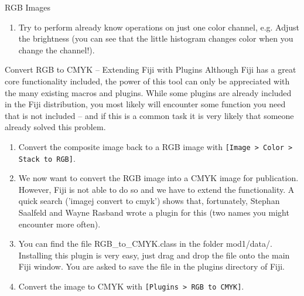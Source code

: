 \begin{taskbox}{RGB Images}
\begin{enumerate}
		\begin{minipage}[t]{\linewidth}
		\begin{center}
		\medskip
		\label{fig:channels-tool-dialog}
		\end{center}
	\end{minipage}
	
	\item Try to perform already know operations on just one color channel, e.g. Adjust the brightness (you can see that the little histogram changes color when you change the channel!).
\end{enumerate}

\end{taskbox}

\begin{taskbox}{Convert RGB to CMYK -- Extending Fiji with Plugins}
Although Fiji has a great core functionality included, the power of this tool can only be appreciated with the many existing macros and plugins. While some plugins are already included in the Fiji distribution, you most likely will encounter some function you need that is not included -- and if this is a common task it is very likely that someone already solved this problem. 

\begin{enumerate}
	\item Convert the composite image back to a RGB image with \texttt{[Image > Color > Stack to RGB]}.
	\item We now want to convert the RGB image into a CMYK image for publication. However, Fiji is not able to do so and we have to extend the functionality. A quick search ('imagej convert to cmyk') shows that, fortunately, Stephan Saalfeld and Wayne Rasband wrote a plugin for this (two names you might encounter more often).
	\item You can find the file RGB\_to\_CMYK.class in the folder mod1/data/. Installing this plugin is very easy, just drag and drop the file onto the main Fiji window. You are asked to save the file in the plugins directory of Fiji. 
	\item Convert the image to CMYK with \texttt{[Plugins > RGB to CMYK]}.
\end{enumerate}

\end{taskbox}


